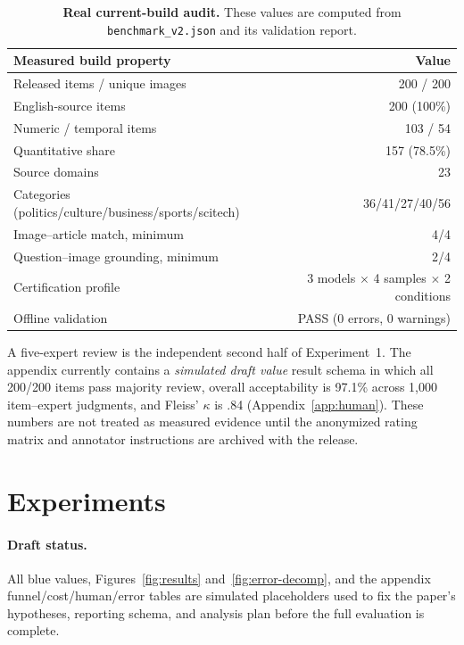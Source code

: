 \documentclass{article}
\newcommand{\placeholder}[1]{\textcolor{blue!65!black}{#1}}
\newcommand{\draftnote}{\textcolor{blue!65!black}{\textit{simulated draft value}}}
\begin{document}
\begin{table}[t]
\centering
\small
\begin{tabular}{lr}
\toprule
Measured build property & Value\\
\midrule
Released items / unique images & 200 / 200\\
English-source items & 200 (100\%)\\
Numeric / temporal items & 103 / 54\\
Quantitative share & 157 (78.5\%)\\
Source domains & 23\\
Categories (politics/culture/business/sports/scitech) &
36/41/27/40/56\\
Image--article match, minimum & 4/4\\
Question--image grounding, minimum & 2/4\\
Certification profile & 3 models $\times$ 4 samples $\times$ 2 conditions\\
Offline validation & PASS (0 errors, 0 warnings)\\
\bottomrule
\end{tabular}
\caption{\textbf{Real current-build audit.} These values are computed from
\texttt{benchmark\_v2.json} and its validation report.}
\label{tab:audit}
\end{table}

A five-expert review is the independent second half of Experiment~1.
The appendix currently contains a \draftnote{} result schema in which all
\placeholder{200/200} items pass majority review, overall acceptability is
\placeholder{97.1\%} across 1,000 item--expert judgments, and Fleiss' $\kappa$
is \placeholder{.84} (Appendix~\ref{app:human}).
These numbers are not treated as measured evidence until the anonymized rating
matrix and annotator instructions are archived with the release.

\section{Experiments}
\label{sec:experiments}

\paragraph{Draft status.}
All blue values, Figures~\ref{fig:results} and~\ref{fig:error-decomp}, and the
appendix funnel/cost/human/error tables are simulated placeholders used to fix
the paper's hypotheses, reporting schema, and analysis plan before the full
evaluation is complete.
\end{document}
